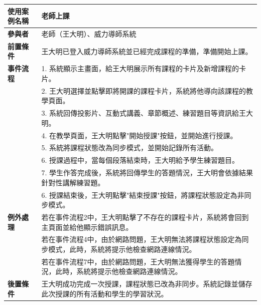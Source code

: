 \documentclass[12pt]{article}
\begin{document}
\begin{table}[H]
  \centering
  \begin{tabular}{|l|p{14cm}|}
  \hline
  \textbf{使用案例名稱} & 老師上課 \\ 
  \hline
  \textbf{參與者} & 老師（王大明）、威力導師系統 \\ 
  \hline
  \textbf{前置條件} & 王大明已登入威力導師系統並已經完成課程的準備，準備開始上課。 \\ 
  \hline
  \textbf{事件流程} 
  & 1. 系統顯示主畫面，給王大明展示所有課程的卡片及新增課程的卡片。 \\
  & 2. 王大明選擇並點擊即將開課的課程卡片，系統將他導向該課程的教學頁面。 \\
  & 3. 系統回傳投影片、互動式講義、章節概述、練習題目等資訊給王大明。 \\
  & 4. 在教學頁面，王大明點擊"開始授課"按鈕，並開始進行授課。 \\
  & 5. 系統將課程狀態改為同步模式，並開始記錄所有活動。 \\
  & 6. 授課過程中，當每個段落結束時，王大明給予學生練習題目。 \\
  & 7. 學生作答完成後，系統將回傳學生的答題情況，王大明會依據結果針對性講解練習題。 \\
  & 6. 授課結束後，王大明點擊"結束授課"按鈕，將課程狀態設定為非同步模式。 \\ 
  \hline
  \textbf{例外處理} 
  & 若在事件流程2中，王大明點擊了不存在的課程卡片，系統將會回到主頁面並給他顯示錯誤訊息。 \\
  & 若在事件流程4中，由於網路問題，王大明無法將課程狀態設定為同步模式，此時，系統將提示他檢查網路連線情況。 \\
  & 若在事件流程7中，由於網路問題，王大明無法獲得學生的答題情況，此時，系統將提示他檢查網路連線情況。 \\
  \hline
  \textbf{後置條件} 
  & 王大明成功完成一次授課，課程狀態已改為非同步。系統記錄並儲存此次授課的所有活動和學生的學習狀況。 \\
  \hline
  \end{tabular}
\end{table}
\end{document}
